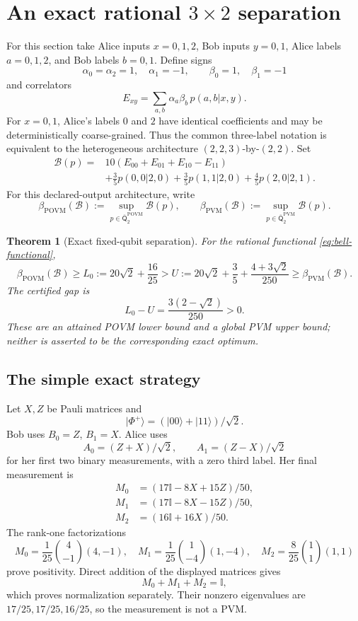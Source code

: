 \documentclass[11pt]{article}
\newtheorem{theorem}{Theorem}[section]
\theoremstyle{definition}
\newcommand{\id}{\mathbb I}
\newcommand{\Qbar}{\overline{\mathsf Q}}
\newcommand{\POVM}{\mathrm{POVM}}
\newcommand{\PVM}{\mathrm{PVM}}
\newcommand{\Bell}{\mathcal B}
\begin{document}
\section[An exact rational 3-by-2 separation]
{An exact rational \(3\times2\) separation}
\label{sec:separation}

For this section take Alice inputs \(x=0,1,2\), Bob inputs \(y=0,1\), Alice
labels \(a=0,1,2\), and Bob labels \(b=0,1\). Define signs
\[
\alpha_0=\alpha_2=1,\quad\alpha_1=-1,\qquad
\beta_0=1,\quad\beta_1=-1
\]
and correlators
\[
E_{xy}=\sum_{a,b}\alpha_a\beta_b\,p(a,b|x,y).
\]
For \(x=0,1\), Alice's labels \(0\) and \(2\) have identical coefficients
and may be deterministically coarse-grained. Thus the common three-label
notation is equivalent to the heterogeneous architecture
\((2,2,3)\)-by-\((2,2)\).
Set
\begin{equation}
\label{eq:bell-functional}
\begin{aligned}
\Bell(p)={}&10(E_{00}+E_{01}+E_{10}-E_{11})\\
&+\frac35p(0,0|2,0)+\frac35p(1,1|2,0)
 +\frac45p(2,0|2,1).
\end{aligned}
\end{equation}
For this declared-output architecture, write
\[
\beta_{\POVM}(\Bell)
:=\sup_{p\in\Qbar^{\POVM}_2}\Bell(p),\qquad
\beta_{\PVM}(\Bell)
:=\sup_{p\in\Qbar^{\PVM}_2}\Bell(p).
\]

\begin{theorem}[Exact fixed-qubit separation]
\label{thm:separation}
For the rational functional \eqref{eq:bell-functional},
\[
\beta_{\POVM}(\Bell)\ge
L_0:=20\sqrt2+\frac{16}{25}
>
U:=20\sqrt2+\frac35+\frac{4+3\sqrt2}{250}
\ge\beta_{\PVM}(\Bell).
\]
The certified gap is
\[
L_0-U=\frac{3(2-\sqrt2)}{250}>0.
\]
These are an attained POVM lower bound and a global PVM upper bound; neither
is asserted to be the corresponding exact optimum.
\end{theorem}

\subsection{The simple exact strategy}

Let \(X,Z\) be Pauli matrices and
\[
|\Phi^+\rangle=(|00\rangle+|11\rangle)/\sqrt2.
\]
Bob uses \(B_0=Z\), \(B_1=X\). Alice uses
\[
A_0=(Z+X)/\sqrt2,\qquad A_1=(Z-X)/\sqrt2
\]
for her first two binary measurements, with a zero third label. Her final
measurement is
\[
\begin{aligned}
M_0&=(17\id-8X+15Z)/50,\\
M_1&=(17\id-8X-15Z)/50,\\
M_2&=(16\id+16X)/50.
\end{aligned}
\]
The rank-one factorizations
\[
M_0=\frac1{25}\binom4{-1}(4,-1),\quad
M_1=\frac1{25}\binom1{-4}(1,-4),\quad
M_2=\frac8{25}\binom11(1,1)
\]
prove positivity. Direct addition of the displayed matrices gives
\[
M_0+M_1+M_2=\id,
\]
which proves normalization separately. Their nonzero eigenvalues are
\(17/25,17/25,16/25\), so the measurement is not a PVM.
\end{document}
